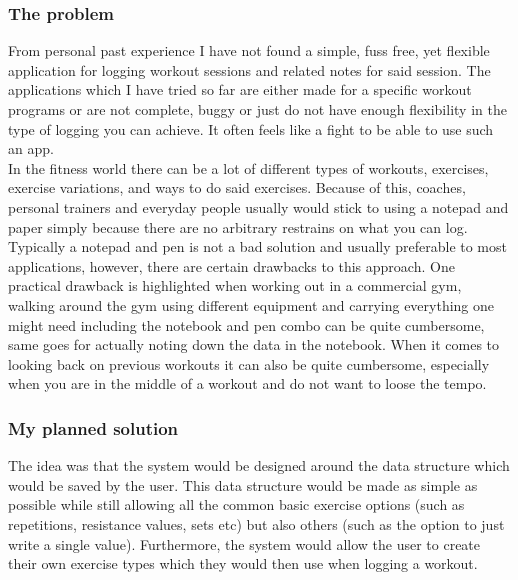 \documentclass{article}
\newcommand{\vspaceconst}{-2ex}
\begin{document}
\begin{multicols}{2}
\subsubsection{The problem}
\vspace{\vspaceconst}

From personal past experience I have not found a simple, fuss free, yet flexible application for logging workout sessions and related notes for said session. The applications which I have tried so far are either made for a specific workout programs or are not complete, buggy or just do not have enough flexibility in the type of logging you can achieve. It often feels like a fight to be able to use such an app.\\
In the fitness world there can be a lot of different types of workouts, exercises, exercise variations, and ways to do said exercises. Because of this, coaches, personal trainers and everyday people usually would stick to using a notepad and paper  simply because there are no arbitrary restrains on what you can log.\\
Typically a notepad and pen is not a bad solution and usually preferable to most applications, however, there are certain drawbacks to this approach. One practical drawback is highlighted when working out in a commercial gym, walking around the gym using different equipment and carrying everything one might need including the notebook and pen combo can be quite cumbersome, same goes for actually noting down the data in the notebook. When it comes to looking back on previous workouts it can also be quite cumbersome, especially when you are in the middle of a workout and do not want to loose the tempo.\\

\subsubsection{My planned solution}
\vspace{\vspaceconst}

The idea was that the system would be designed around the data structure which would be saved by the user. This data structure would be made as simple as possible while still allowing all the common basic exercise options (such as repetitions, resistance values, sets etc) but also others (such as the option to just write a single value). Furthermore, the system would allow the user to create their own exercise types which they would then use when logging a workout. 


\end{multicols}
\end{document}
